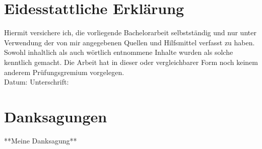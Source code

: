 \setcounter{secnumdepth}{0}
\section{Eidesstattliche Erklärung}

Hiermit versichere ich, die vorliegende Bachelorarbeit selbstständig und nur unter Verwendung der von mir angegebenen Quellen und Hilfsmittel verfasst zu haben. Sowohl inhaltlich als auch wörtlich entnommene Inhalte wurden als solche kenntlich gemacht. Die Arbeit hat in dieser oder vergleichbarer Form noch keinem anderem Prüfungsgremium vorgelegen.
\\[1.5cm]
Datum:	\hrulefill\enspace Unterschrift: \hrulefill


\newpage

\section{Danksagungen}
**Meine Danksagung**
